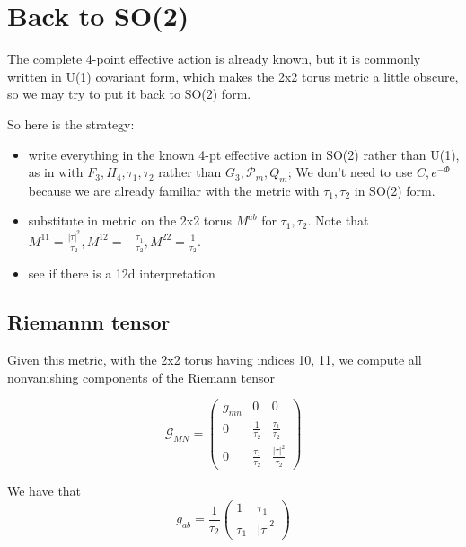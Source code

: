 \section{Back to SO(2)}



The complete 4-point effective action is already known, but it is commonly written in U(1) covariant form, which makes the 2x2 torus metric a little obscure, so we may try to put it back to SO(2) form.

So here is the strategy:
\begin{itemize}
    \item write everything in the known 4-pt effective action in SO(2) rather than U(1), as in with $F_3, H_4, \tau_1, \tau_2$ rather than $G_3, \mathcal{P}_m, Q_m$; We don't need to use $C, e^{-\Phi}$ because we are already familiar with the metric with $\tau_1, \tau_2$ in SO(2) form.
    \item substitute in metric on the 2x2 torus $M^{ab}$ for $\tau_1, \tau_2$. Note that $M^{11} = \frac{|\tau|^2}{\tau_2}, M^{12} = -\frac{\tau_1}{\tau_2}, M^{22} = \frac{1}{\tau_2}$.
    \item see if there is a 12d interpretation
\end{itemize}


\subsection{Riemannn tensor}

Given this metric, with the 2x2 torus having indices 10, 11, we compute all nonvanishing components of the Riemann tensor

\begin{equation}
\mathcal{G}_{MN}
= \begin{pmatrix}
    g_{mn} & 0 & 0 \\
    0 & \frac{1}{\tau_2} & \frac{\tau_1}{\tau_2} \\
    0 & \frac{\tau_1}{\tau_2} & \frac{|\tau|^2}{\tau_2}
\end{pmatrix}
\end{equation}

We have that
\begin{equation}
g_{ab} = \frac{1}{\tau_2}\begin{pmatrix}
    1 & \tau_1 \\
    \tau_1 & |\tau|^2
\end{pmatrix}
\end{equation}

